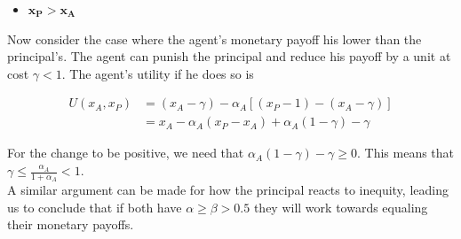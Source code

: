 \documentclass[12pt]{article}
\begin{document}
\begin{itemize}
\item $\mathbf{x_P > x_A}$
\end{itemize}


Now consider the case where the agent's monetary payoff his lower than the principal's. The agent can punish the principal and reduce his payoff by a unit at cost $\gamma < 1$. The agent's utility if he does so is

 \begin{equation*}
\begin{split}
 U\left(x_A,x_P \right) & = \left(x_A - \gamma \right) - \alpha_A \left[\left(x_P - 1\right)-\left(x_A - \gamma\right)\right] \\
& = x_A - \alpha_A \left(x_P - x_A\right)+\alpha_A \left(1-\gamma\right) - \gamma
\end{split}
\end{equation*}

For the change to be positive, we need that $\alpha_A\left(1-\gamma\right) - \gamma \geq 0$. This means that $\gamma \leq \frac{\alpha_A}{1+\alpha_A} < 1$. 
\\

A similar argument can be made for how the principal reacts to inequity, leading us to conclude that if both have $\alpha \geq \beta > 0.5$ they will work towards equaling their monetary payoffs.

\end{document}

